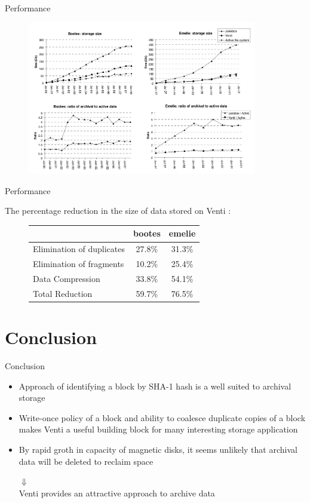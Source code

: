 \begin{frame}{Performance}

\begin{figure}
\includegraphics[width = 10cm]{pic6.png}
\end{figure}

\end{frame}

\begin{frame}{Performance}

The percentage reduction in the size of data stored on Venti :

\begin{figure}
\begin{tabular}{lcc}
\hline
&bootes &emelie \\
\hline
Elimination of duplicates & 27.8\% & 31.3\% \\
Elimination of fragments & 10.2\% & 25.4\% \\
Data Compression & 33.8\% & 54.1\% \\
Total Reduction & 59.7\% & 76.5\% \\
\hline
\end{tabular}
\end{figure}

\end{frame}

\section{Conclusion}\label{conclusion}

\begin{frame}{Conclusion}

\begin{itemize}
\itemsep1pt\parskip0pt
\item
  Approach of identifying a block by SHA-1 hash is a well suited to
  archival storage
\item
  Write-once policy of a block and ability to coalesce duplicate copies
  of a block makes Venti a useful building block for many interesting
  storage application
\item
  By rapid groth in capacity of magnetic disks, it seems unlikely that
  archival data will be deleted to reclaim space

  \begin{center}
  $\Downarrow{}$\\
  Venti provides an attractive approach to archive data
  \end{center}
\end{itemize}

\end{frame}
